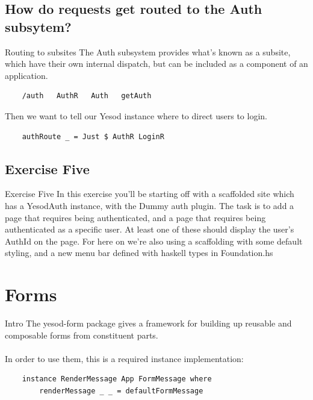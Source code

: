 \documentclass[pdf]{beamer}
\begin{document}
\subsection{How do requests get routed to the Auth subsytem?}
\begin{frame}[fragile]{Routing to subsites}
  The Auth subsystem provides what's known as a subsite, which have
  their own internal dispatch, but can be included as a component of
  an application.
  \pause
  \begin{verbatim}
    /auth   AuthR   Auth   getAuth
  \end{verbatim}
  \pause
  Then we want to tell our Yesod instance where to direct users to login.
  \begin{verbatim}
    authRoute _ = Just $ AuthR LoginR
  \end{verbatim}
\end{frame}

\subsection{Exercise Five}
\begin{frame}{Exercise Five}
  In this exercise you'll be starting off with a scaffolded site which
  has a YesodAuth instance, with the Dummy auth plugin. The task is to
  add a page that requires being authenticated, and a page that
  requires being authenticated as a specific user. At least one of
  these should display the user's AuthId on the page. For here on
  we're also using a scaffolding with some default styling, and a new
  menu bar defined with haskell types in Foundation.hs
\end{frame}

\section{Forms}
\begin{frame}[fragile]{Intro}
  The yesod-form package gives a framework for building up reusable
  and composable forms from constituent parts.\\
  \\
  \pause
  In order to use them, this is a required instance implementation:
  \begin{verbatim}
    instance RenderMessage App FormMessage where
        renderMessage _ _ = defaultFormMessage
  \end{verbatim}
\end{frame}
\end{document}
